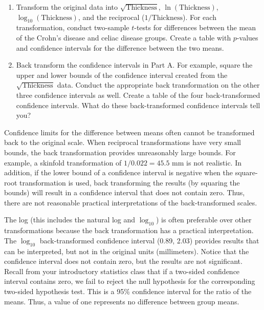 \documentclass[
]{report}
\begin{document}
\begin{enumerate}
  \begin{enumerate}
    \item Transform the original data into $\scriptstyle \sqrt{\text{Thickness}}$, $\scriptstyle \ln(\text{Thickness})$, $\scriptstyle \log_{10}(\text{Thickness})$, and the reciprocal ($\scriptstyle 1/\text{Thickness}$). For each transformation, conduct two-sample $\scriptstyle t$-tests for differences between the mean of the Crohn’s disease and celiac disease groups. Create a table with $\scriptstyle p$-values and confidence intervals for the difference between the two means.
      \item Back transform the confidence intervals in Part A. For example, square the upper and lower bounds of the confidence interval created from the $\scriptstyle \sqrt{\text{Thickness}}$ data. Conduct the appropriate back transformation on the other three confidence intervals as well. Create a table of the four back-transformed confidence intervals. What do these back-transformed confidence intervals tell you?
    \end{enumerate}

Confidence limits for the difference between means often cannot be transformed back to the original scale. When reciprocal transformations have very small bounds, the back transformation provides unreasonably large bounds. For example, a skinfold transformation of $\scriptstyle 1/0.022 = 45.5$ mm is not realistic. In addition, if the lower bound of a confidence interval is negative when the square-root transformation is used, back transforming the results (by squaring the bounds) will result in a confidence interval that does not contain zero. Thus, there are not reasonable practical interpretations of the back-transformed scales.

The log (this includes the natural log and $\scriptstyle \log_{10}$) is often preferable over other transformations because the back transformation has a practical interpretation. The $\scriptstyle \log_{10}$ back-transformed confidence interval (0.89, 2.03) provides results that can be interpreted, but not in the original units (millimeters). Notice that the confidence interval does not contain zero, but the results are not significant. Recall from your introductory statistics class that if a two-sided confidence interval contains zero, we fail to reject the null hypothesis for the corresponding two-sided hypothesis test. This is a 95\% confidence interval for the ratio of the means. Thus, a value of one represents no difference between group means.


\end{enumerate}
\end{document}

